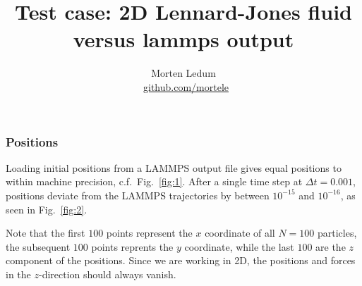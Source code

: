 \documentclass[a4paper, twocolumn]{article}
\title{{\titlefont Test case: 2D Lennard-Jones fluid versus lammps output}}
\author{Morten Ledum \\ \faGithub \ {\small \href{https://github.com/mortele}{github.com/mortele}}}
\newcommand{\fig}[1]{Fig.\ \ref{fig:#1}}
\begin{document}
\maketitle



\subsubsection*{Positions}
Loading initial positions from a LAMMPS output file gives equal positions to within machine precision, c.f.\ \fig{1}. After a single time step at $\Delta t=0.001$, positions deviate from the LAMMPS trajectories by between $10^{-15}$ and $10^{-16}$, as seen in \fig{2}. 

Note that the first $100$ points represent the $x$ coordinate of all $N=100$ particles, the subsequent $100$ points reprents the $y$ coordinate, while the last $100$ are the $z$ component of the positions. Since we are working in 2D, the positions and forces in the $z$-direction should always vanish.
\end{document}
